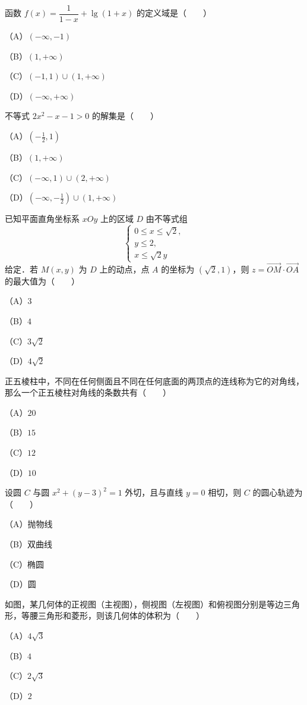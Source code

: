 \begin{question}
函数 $f(x)=\dfrac{1}{1-x}+\lg(1+x)$ 的定义域是\mbox{（　　）}

（A）$(-\infty,-1)$

（B）$(1,+\infty)$

（C）$(-1,1)\cup(1,+\infty)$

（D）$(-\infty,+\infty)$
\end{question}
\begin{question}
不等式 $2x^2-x-1>0$ 的解集是\mbox{（　　）}

（A）$\left(-\frac12,1\right)$

（B）$(1,+\infty)$

（C）$(-\infty,1)\cup(2,+\infty)$

（D）$\left(-\infty,-\frac12\right)\cup(1,+\infty)$
\end{question}
\begin{question}
已知平面直角坐标系 $xOy$ 上的区域 $D$ 由不等式组
\nopagebreak[4]
\[
\begin{cases}
0\leqslant x\leqslant\sqrt2,\\
y\leqslant2,\\
x\leqslant\sqrt2y
\end{cases}
\]
给定．若 $M(x,y)$ 为 $D$ 上的动点，点 $A$ 的坐标为 $(\sqrt2,1)$，则 $z=\overrightarrow{OM}\cdot\overrightarrow{OA}$ 的最大值为\mbox{（　　）}

（A）$3$

（B）$4$

（C）$3\sqrt2$

（D）$4\sqrt2$
\end{question}
\begin{question}
正五棱柱中，不同在任何侧面且不同在任何底面的两顶点的连线称为它的对角线，那么一个正五棱柱对角线的条数共有\mbox{（　　）}

（A）$20$

（B）$15$

（C）$12$

（D）$10$
\end{question}
\begin{question}
设圆 $C$ 与圆 $x^2+(y-3)^2=1$ 外切，且与直线 $y=0$ 相切，则 $C$ 的圆心轨迹为\mbox{（　　）}

（A）抛物线

（B）双曲线

（C）椭圆

（D）圆
\Needspace{0.4\textheight}
\end{question}
\begin{question}
如图，某几何体的正视图（主视图），侧视图（左视图）和俯视图分别是等边三角形，等腰三角形和菱形，则该几何体的体积为\mbox{（　　）}

（A）$4\sqrt3$

（B）$4$

（C）$2\sqrt3$

（D）$2$
\nopagebreak[4]
\begin{center}\end{center}
\nopagebreak[4]
\end{question}
